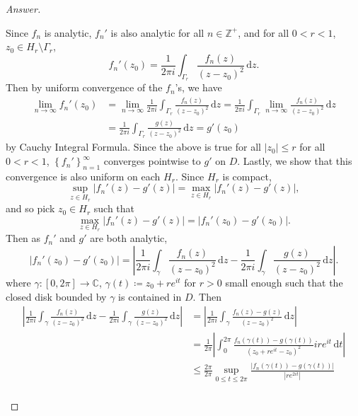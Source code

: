 \documentclass[12pt]{article}
\newcommand{\z}{\mathbb{Z}}
\newcommand{\cx}{\mathbb{C}}
\newcommand\paren[1]{\left( #1 \right)}
\newcommand\setb[1]{\left \{ #1 \right \}}
\newcommand{\abs}[1]{\left| #1 \right|}
\theoremstyle{definition}
\begin{document}
\begin{proof}[Answer]
\begin{enumerate}[a.]
        Since $f_n$ is analytic, $f_n'$ is also analytic for all $n \in \z^+$, and for all $0 < r < 1$, $z_0 \in H_r \setminus \Gamma_r$,
        \[
            f_n'(z_0) = \frac{1}{2\pi i} \int_{\Gamma_r} \frac{f_n(z)}{ \paren{ z - z_0 }^{2} } \, \mathrm{d}z.
        \]
        Then by uniform convergence of the $f_n$'s, we have 
        \begin{align*}
            \lim\limits_{n \to \infty} f_n'(z_0) & = \lim\limits_{n \to \infty} \frac{1}{2\pi i} \int_{\Gamma_r} \frac{f_n(z)}{ \paren{ z - z_0 }^{2} } \, \mathrm{d}z =  \frac{1}{2\pi i} \int_{\Gamma_r} \lim\limits_{n \to \infty} \frac{f_n(z)}{ \paren{ z - z_0 }^{2} } \, \mathrm{d}z \\
            & = \frac{1}{2\pi i} \int_{\Gamma_r} \frac{g(z)}{ \paren{ z - z_0 }^{2} } \, \mathrm{d}z = g'(z_0)
        \end{align*}
        by Cauchy Integral Formula. Since the above is true for all $|z_0| \leq r$ for all $0 < r < 1$, $\setb{ f_n' }_{n=1}^{\infty}$ converges pointwise to $g'$ on $D$. Lastly, we show that this convergence is also uniform on each $H_r$. Since $H_r$ is compact,
        \[
            \sup\limits_{z \in H_r} \abs{ f_n'(z) - g'(z) } = \max\limits_{z \in H_r} \abs{ f_n'(z) - g'(z) },
        \]
        and so pick $z_0 \in H_r$ such that 
        \[
            \max\limits_{z \in H_r} \abs{ f_n'(z) - g'(z) } = \abs{ f_n' \paren{ z_0 } - g' \paren{z_0} }.
        \]
        Then as $f_n'$ and $g'$ are both analytic,
        \[
            \abs{ f_n' \paren{ z_0 } - g' \paren{z_0} } = \abs{ \frac{1}{2\pi i} \int_{\gamma} \frac{f_n(z)}{\paren{z-z_0}^2} \, \mathrm{d}z - \frac{1}{2\pi i} \int_{\gamma} \frac{g(z)}{\paren{z-z_0}^2} \, \mathrm{d}z }.
        \]
        where $\gamma : [0,2\pi] \to \cx$, $\gamma(t) \coloneqq z_0 + re^{it}$ for $r > 0$ small enough such that the closed disk bounded by $\gamma$ is contained in $D$. Then 
        \begin{align*}
            \abs{ \frac{1}{2\pi i} \int_{\gamma} \frac{f_n(z)}{\paren{z-z_0}^2} \, \mathrm{d}z - \frac{1}{2\pi i} \int_{\gamma} \frac{g(z)}{\paren{z-z_0}^2} \, \mathrm{d}z } & = \abs{ \frac{1}{2\pi i} \int_{\gamma} \frac{f_n(z) - g(z)}{\paren{z-z_0}^2} \, \mathrm{d}z } \\
            & = \frac{1}{2\pi} \abs{ \int_0^{2\pi} \frac{ f_n \paren{ \gamma(t) } - g \paren{ \gamma(t) } }{ \paren{ z_0 + re^{it} - z_0 }^2 } i re^{it} \, \mathrm{d}t } \\
            & \leq \frac{2 \pi}{2 \pi} \sup\limits_{0 \leq t \leq 2\pi} \frac{\abs{f_n \paren{ \gamma(t) } - g \paren{ \gamma(t) }}}{\abs{   r e^{2it}} } \\

\end{align*}
\end{enumerate}
\end{proof}
\end{document}
